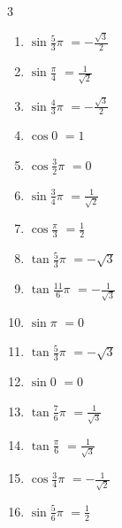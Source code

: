\begin{multicols}{3}
\begin{enumerate}
  \item $\displaystyle \sin{\frac{5}{3}\pi}$
        $\displaystyle =-\frac{\sqrt{3}}{2}$

  \item $\displaystyle \sin{\frac{\pi}{4}}$
        $\displaystyle =\frac{1}{\sqrt{2}}$

  \item $\displaystyle \sin{\frac{4}{3}\pi}$
        $\displaystyle =-\frac{\sqrt{3}}{2}$

  \item $\displaystyle \cos{0}$
        $\displaystyle =1$

  \item $\displaystyle \cos{\frac{3}{2}\pi}$
        $\displaystyle =0$

  \item $\displaystyle \sin{\frac{3}{4}\pi}$
        $\displaystyle =\frac{1}{\sqrt{2}}$

  \item $\displaystyle \cos{\frac{\pi}{3}}$
        $\displaystyle =\frac{1}{2}$

  \item $\displaystyle \tan{\frac{5}{3}\pi}$
        $\displaystyle =-\sqrt{3}$

  \item $\displaystyle \tan{\frac{11}{6}\pi}$
        $\displaystyle =-\frac{1}{\sqrt{3}}$

\columnbreak %

  \item $\displaystyle \sin{\pi}$
        $\displaystyle =0$

  \item $\displaystyle \tan{\frac{5}{3}\pi}$
        $\displaystyle =-\sqrt{3}$

  \item $\displaystyle \sin{0}$
        $\displaystyle =0$

  \item $\displaystyle \tan{\frac{7}{6}\pi}$
        $\displaystyle =\frac{1}{\sqrt{3}}$

  \item $\displaystyle \tan{\frac{\pi}{6}}$
        $\displaystyle =\frac{1}{\sqrt{3}}$

  \item $\displaystyle \cos{\frac{3}{4}\pi}$
        $\displaystyle =-\frac{1}{\sqrt{2}}$

  \item $\displaystyle \sin{\frac{5}{6}\pi}$
        $\displaystyle =\frac{1}{2}$


\end{enumerate}
\end{multicols}
